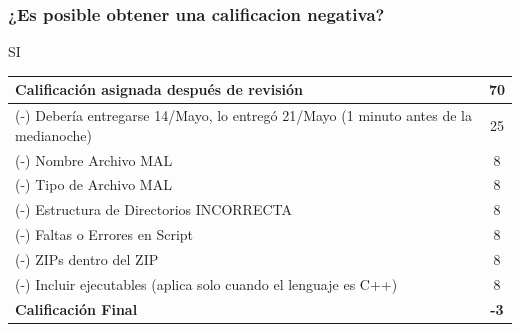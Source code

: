 \begin{frame}
\frametitle{¿Es posible obtener una calificacion negativa?}
SI
\begin{center}
\begin{tabular}{p{12cm}|c}
\hline
Calificación asignada después de revisión & 70 \\ \hline
(-) Debería entregarse 14/Mayo, lo entregó 21/Mayo (1 minuto antes de la medianoche) & 25 \\
(-) Nombre Archivo MAL & 8 \\ 
(-) Tipo de Archivo MAL & 8 \\ 
(-) Estructura de Directorios INCORRECTA & 8 \\ 
(-) Faltas o Errores en Script  & 8 \\ 
(-) ZIPs dentro del ZIP  & 8 \\ 
(-) Incluir ejecutables (aplica solo cuando el lenguaje es C++)  & 8 \\ \hline
\textbf{Calificación Final}  & \textbf{-3} \\ \hline
\hline
\hline
\end{tabular}


\end{center}


\end{frame}




